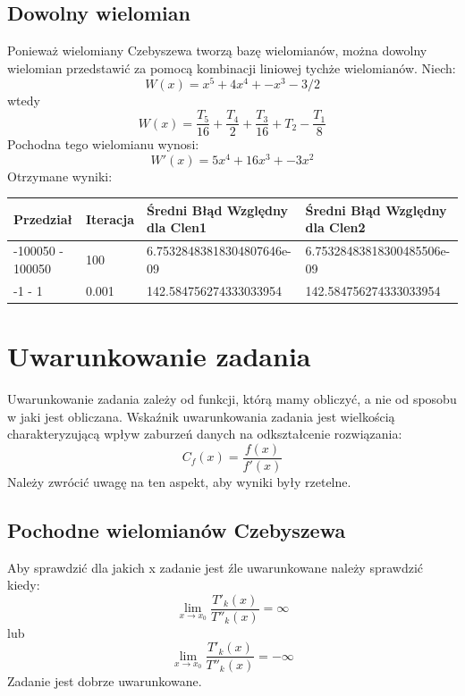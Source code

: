 \documentclass{article}
\begin{document}
\subsection{Dowolny wielomian}
\indent Ponieważ wielomiany Czebyszewa tworzą bazę wielomianów, można dowolny wielomian przedstawić za pomocą kombinacji liniowej tychże wielomianów. Niech:
\begin{equation}
    W(x) = x^5 + 4x^4 + - x^3 - 3/2
\end{equation}
wtedy
$$W(x) = \frac{T_5}{16} + \frac{T_4}{2} + \frac{T_3}{16} + T_2 - \frac{T_1}{8}$$
Pochodna tego wielomianu wynosi:
\begin{equation}
    W'(x) = 5x^4 + 16x^3 + - 3x^2
\end{equation}
Otrzymane wyniki:\\
    \begin{tabular}{ |p{3cm}|p{1.1cm}|p{4.5cm}|p{4.5cm}|}
     \hline
     Przedział & Iteracja & Średni Błąd Względny dla Clen1 & Średni Błąd Względny dla Clen2\\
     \hline
     -100050 - 100050 & 100 & 6.75328483818304807646e-09 & 6.75328483818300485506e-09\\
     \hline
     -1 - 1 & 0.001 & 142.584756274333033954 & 142.584756274333033954\\
     \hline
    \end{tabular}

\section{Uwarunkowanie zadania}

Uwarunkowanie zadania zależy od funkcji, którą mamy obliczyć, a nie od sposobu w jaki jest obliczana.
Wskaźnik uwarunkowania zadania jest wielkością charakteryzującą wpływ zaburzeń danych na odkształcenie rozwiązania:
\begin{equation}
    C_{f}(x) =  \frac{f(x)}{f'(x)}
\end{equation}
 Należy zwrócić uwagę na ten aspekt, aby wyniki były rzetelne.

\subsection{Pochodne wielomianów Czebyszewa}
Aby sprawdzić dla jakich x zadanie jest źle uwarunkowane należy sprawdzić kiedy:
\begin{equation} 
    \lim_{x\to x_0} \frac{T'_{k}(x)}{T''_{k}(x)}=\infty
\end{equation}
lub
\begin{equation} 
    \lim_{x\to x_0} \frac{T'_{k}(x)}{T''_{k}(x)}=-\infty
\end{equation}
Zadanie jest dobrze uwarunkowane.
\end{document}
